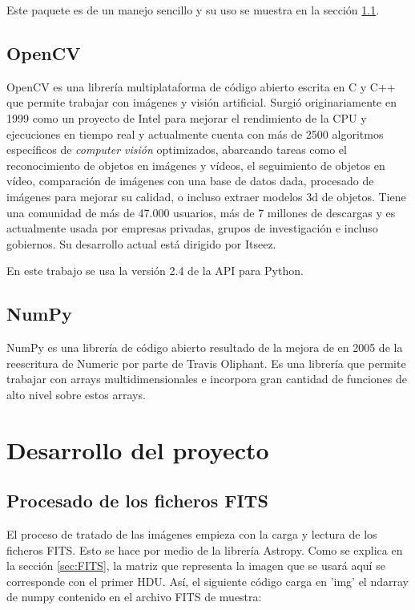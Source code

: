 \documentclass[a4paper,12pt]{article}
\begin{document}
Este paquete es de un manejo sencillo y su uso se muestra en la sección \ref{sec:Procesado}.
\subsection{OpenCV}
OpenCV\cite{opencv,oreilly} es una librería multiplataforma de código abierto escrita en C y C++ que permite trabajar con imágenes y visión artificial. Surgió originariamente en 1999 como un proyecto de Intel para mejorar el rendimiento de la CPU y ejecuciones en tiempo real y actualmente cuenta con más de 2500 algoritmos específicos de \textit{computer visión} optimizados, abarcando tareas como el reconocimiento de objetos en imágenes y vídeos, el seguimiento de objetos en vídeo, comparación de imágenes con una base de datos dada, procesado de imágenes para mejorar su calidad, o incluso extraer modelos 3d de objetos. Tiene una comunidad de más de 47.000 usuarios, más de 7 millones de descargas y es actualmente usada por empresas privadas, grupos de investigación e incluso gobiernos. Su desarrollo actual está dirigido por Itseez.

En este trabajo se usa la versión 2.4 de la API para Python.
\subsection{NumPy}
NumPy\cite{numpy} es una librería de código abierto resultado de la mejora de en 2005 de la reescritura de Numeric por parte de Travis Oliphant. Es una librería que permite trabajar con arrays multidimensionales e incorpora gran cantidad de funciones de alto nivel sobre estos arrays.
\section{Desarrollo del proyecto}
\label{sec:desarrollo}
\subsection{Procesado de los ficheros FITS}
\label{sec:Procesado}
El proceso de tratado de las imágenes empieza con la carga y lectura de los ficheros FITS. Esto se hace por medio de la librería Astropy. Como se explica en la sección \ref{sec:FITS}, la matriz que representa la imagen que se usará aquí se corresponde con el primer HDU. Así, el siguiente código carga en 'img' el ndarray de numpy contenido en el archivo FITS de muestra:


\end{document}
